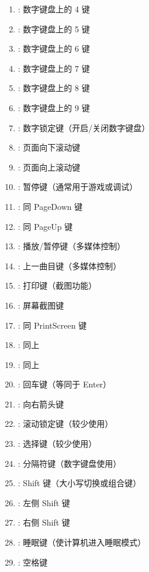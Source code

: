 \begin{enumerate}[label=\arabic*)]
    \item {}: 数字键盘上的 4 键
    \item {}: 数字键盘上的 5 键
    \item {}: 数字键盘上的 6 键
    \item {}: 数字键盘上的 7 键
    \item {}: 数字键盘上的 8 键
    \item {}: 数字键盘上的 9 键
    \item {}: 数字锁定键（开启/关闭数字键盘）
    \item {}: 页面向下滚动键
    \item {}: 页面向上滚动键
    \item {}: 暂停键（通常用于游戏或调试）
    \item {}: 同 PageDown 键
    \item {}: 同 PageUp 键
    \item {}: 播放/暂停键（多媒体控制）
    \item {}: 上一曲目键（多媒体控制）
    \item {}: 打印键（截图功能）
    \item {}: 屏幕截图键
    \item {}: 同 PrintScreen 键
    \item {}: 同上
    \item {}: 同上
    \item {}: 回车键（等同于 Enter）
    \item {}: 向右箭头键
    \item {}: 滚动锁定键（较少使用）
    \item {}: 选择键（较少使用）
    \item {}: 分隔符键（数字键盘使用）
    \item {}: Shift 键（大小写切换或组合键）
    \item {}: 左侧 Shift 键
    \item {}: 右侧 Shift 键
    \item {}: 睡眠键（使计算机进入睡眠模式）
    \item {}: 空格键

\end{enumerate}
